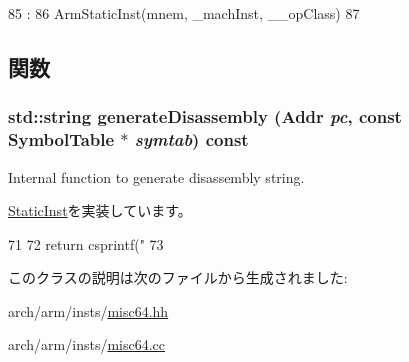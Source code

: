 \begin{DoxyCode}
85                                                                             :
86         ArmStaticInst(mnem, _machInst, __opClass)
87     {}

\end{DoxyCode}


\subsection{関数}
\hypertarget{classUnknownOp64_a95d323a22a5f07e14d6b4c9385a91896}{
\subsubsection[{generateDisassembly}]{\setlength{\rightskip}{0pt plus 5cm}std::string generateDisassembly ({\bf Addr} {\em pc}, \/  const SymbolTable $\ast$ {\em symtab}) const}}
\label{classUnknownOp64_a95d323a22a5f07e14d6b4c9385a91896}
Internal function to generate disassembly string. 

\hyperlink{classStaticInst_ab4a569d2623620c04f8a52bbd91d63b9}{StaticInst}を実装しています。


\begin{DoxyCode}
71 {
72     return csprintf("%
73 }
\end{DoxyCode}


このクラスの説明は次のファイルから生成されました:\begin{DoxyCompactItemize}
\item 
arch/arm/insts/\hyperlink{misc64_8hh}{misc64.hh}\item 
arch/arm/insts/\hyperlink{misc64_8cc}{misc64.cc}\end{DoxyCompactItemize}
